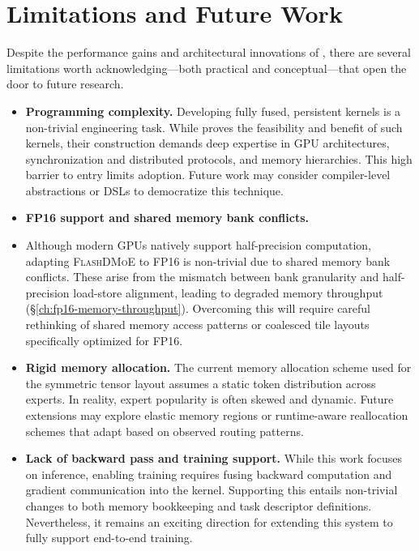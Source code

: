 \chapter{Limitations and Future Work}\label{ch:limitations-and-future-work}
Despite the performance gains and architectural innovations of \sysname, there are several limitations
worth acknowledging---both practical and conceptual---that open the door to future research.
\begin{itemize}
    \item \textbf{Programming complexity.} Developing fully fused, persistent kernels is a non-trivial engineering task.
    While \sysname proves the feasibility and benefit of such kernels,
    their construction demands deep expertise in GPU architectures,
    synchronization and distributed protocols, and memory hierarchies.
    This high barrier to entry limits adoption.
    Future work may consider compiler-level abstractions or DSLs to democratize this technique.

    \item \textbf{FP16 support and shared memory bank conflicts.}
    \item Although modern GPUs natively support half-precision computation,
    adapting \textsc{FlashDMoE} to FP16 is non-trivial due to shared memory bank conflicts.
    These arise from the mismatch between bank granularity and half-precision
    load-store alignment, leading to degraded memory throughput (\S\ref{ch:fp16-memory-throughput}).
    Overcoming this will require careful rethinking of shared memory access patterns or
    coalesced tile layouts specifically optimized for FP16.

    \item \textbf{Rigid memory allocation.} The current memory allocation scheme used for the symmetric tensor layout
    assumes a static token distribution across experts.
    In reality, expert popularity is often skewed and dynamic.
    Future extensions may explore elastic memory regions or
    runtime-aware reallocation schemes that adapt based on observed routing patterns.

    \item \textbf{Lack of backward pass and training support.} While this work focuses on inference,
    enabling training requires fusing backward computation and gradient communication into the kernel.
    Supporting this entails non-trivial changes to both memory bookkeeping and task descriptor definitions.
    Nevertheless, it remains an exciting direction for extending this system to
    fully support end-to-end training.
\end{itemize}


